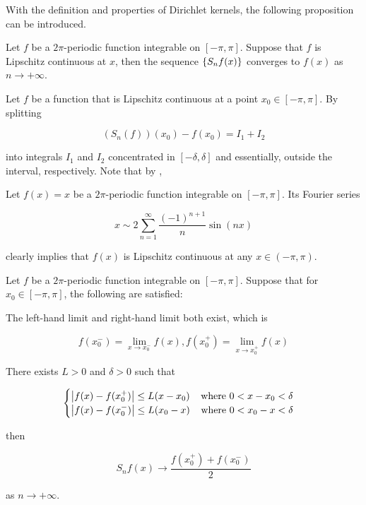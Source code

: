 \documentclass[a4paper,12pt]{article}
\begin{document}
With the definition and properties of Dirichlet kernels, the following proposition can be introduced.\n

\begin{pst}
  Let $f$ be a $2\pi$-periodic function integrable on $[-\pi,\pi]$. Suppose that $f$ is Lipschitz continuous at $x$, then the sequence $\left\{ S_{n}f(x)\right\}$ converges to $f(x)$ as $n\to+\infty$.\n

  \prf Let $f$ be a function that is Lipschitz continuous at a point $x_{0}\in[-\pi,\pi]$. By splitting
  
  $$(S_{n}(f))(x_{0})-f(x_{0})=I_{1}+I_{2}$$\s

  into integrals $I_{1}$ and $I_{2}$ concentrated in $[-\delta,\delta]$ and essentially, outside the interval, respectively. Note that by \rpst[\sctd{1}],
\end{pst}\n

\begin{exm}
  Let $f(x)=x$ be a $2\pi$-periodic function integrable on $[-\pi,\pi]$. Its Fourier series

  $$x\sim 2\sum_{n=1}^{\infty}\frac{(-1)^{n+1}}{n}\sin(nx)$$\s

  clearly implies that $f(x)$ is Lipschitz continuous at any $x\in(-\pi,\pi)$.
\end{exm}\n

\begin{pst}
  Let $f$ be a $2\pi$-periodic function integrable on $[-\pi,\pi]$. Suppose that for $x_{0}\in[-\pi,\pi]$, the following are satisfied:

  \begin{alist}
    \item The left-hand limit and right-hand limit both exist, which is
    
    $$f(x^{-}_{0})=\lim_{x\to x^{-}_{0}}f(x),f(x^{+}_{0})=\lim_{x\to x^{+}_{0}}f(x)$$

    \item There exists $L>0$ and $\delta>0$ such that
    
    $$\begin{cases}
      \left| f(x)-f(x^{+}_{0})\right|\leq L(x-x_{0})\;\;\;\;\text{where }0<x-x_{0}<\delta\\
      \left| f(x)-f(x^{-}_{0})\right|\leq L(x_{0}-x)\;\;\;\;\text{where }0<x_{0}-x<\delta
    \end{cases}$$
  \end{alist}

  then

  $$S_{n}f(x)\to\frac{f(x^{+}_{0})+f(x^{-}_{0})}{2}$$\s

  as $n\to+\infty$.
\end{pst}\n
\end{document}
